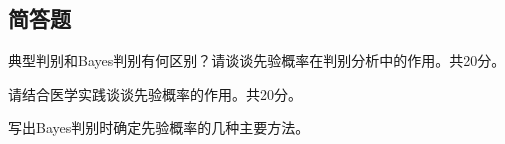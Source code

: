 \par\addvspace{6pt}\noindent\begin{minipage}{\linewidth}

\subsection{简答题}


典型判别和Bayes判别有何区别？请谈谈先验概率在判别分析中的作用。共20分。



\end{minipage}\par\vspace{4pt}

\par\addvspace{6pt}\noindent\begin{minipage}{\linewidth}


请结合医学实践谈谈先验概率的作用。共20分。



\end{minipage}\par\vspace{4pt}

\par\addvspace{6pt}\noindent\begin{minipage}{\linewidth}


写出Bayes判别时确定先验概率的几种主要方法。



\end{minipage}\par\vspace{4pt}

